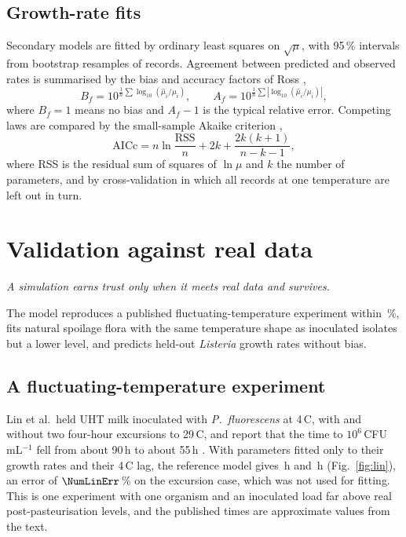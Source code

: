 \documentclass[11pt,a4paper,twoside,openany]{book}
\newcommand{\hook}[1]{{\noindent\fontsize{14}{20}\selectfont\itshape\color{dggrey}#1\par}\vspace{14pt}}
\newcommand{\degC}{\,\textdegree C}
\theoremstyle{plain}\newtheorem{proposition}{Proposition}\newtheorem{corollary}{Corollary}
\theoremstyle{definition}\newtheorem{definition}{Definition}[chapter]
\begin{document}
\section{Growth-rate fits}
Secondary models are fitted by ordinary least squares on $\sqrt{\mu}$, with 95\,\% intervals from bootstrap resamples of records. Agreement between predicted and observed rates is summarised by the bias and accuracy factors of Ross \cite{ross1996},
\begin{equation}\label{eq:bfaf}
B_f=10^{\frac1n\sum\log_{10}(\hat\mu_i/\mu_i)},\qquad A_f=10^{\frac1n\sum|\log_{10}(\hat\mu_i/\mu_i)|},
\end{equation}
where $B_f=1$ means no bias and $A_f-1$ is the typical relative error. Competing laws are compared by the small-sample Akaike criterion \cite{akaike1974,hurvich1989},
\begin{equation}\label{eq:aicc}
\mathrm{AICc}=n\ln\frac{\mathrm{RSS}}{n}+2k+\frac{2k(k+1)}{n-k-1},
\end{equation}
where RSS is the residual sum of squares of $\ln\mu$ and $k$ the number of parameters, and by cross-validation in which all records at one temperature are left out in turn.

\chapter{Validation against real data}\label{ch:val}
\hook{A simulation earns trust only when it meets real data and survives.}
\begin{summary}
The model reproduces a published fluctuating-temperature experiment within \NumLinErrAbs\,\%, fits natural spoilage flora with the same temperature shape as inoculated isolates but a lower level, and predicts held-out \textit{Listeria} growth rates without bias.
\end{summary}
\section{A fluctuating-temperature experiment}
Lin et al.\ held UHT milk inoculated with \textit{P.~fluorescens} at 4\degC, with and without two four-hour excursions to 29\degC, and report that the time to $10^6$\,CFU\,mL$^{-1}$ fell from about 90\,h to about 55\,h \cite{lin2016}. With parameters fitted only to their growth rates and their 4\degC{} lag, the reference model gives \NumLinConst\,h and \NumLinExc\,h (Fig.~\ref{fig:lin}), an error of $\NumLinErr$\,\% on the excursion case, which was not used for fitting. This is one experiment with one organism and an inoculated load far above real post-pasteurisation levels, and the published times are approximate values from the text.
\end{document}
